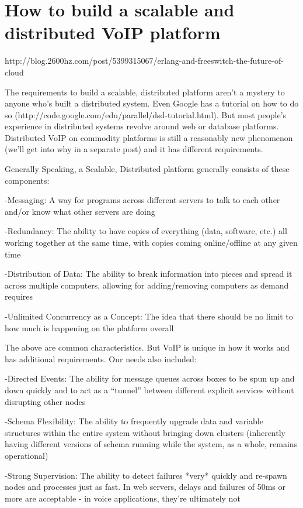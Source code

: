 \chapter{How to build a scalable and distributed VoIP platform}
\label{ch:platform}
http://blog.2600hz.com/post/5399315067/erlang-and-freeswitch-the-future-of-cloud

The requirements to build a scalable, distributed platform aren’t a mystery to anyone who’s built a distributed system. Even Google has a tutorial on how to do so (http://code.google.com/edu/parallel/dsd-tutorial.html). But most people’s experience in distributed systems revolve around web or database platforms. Distributed VoIP on commodity platforms is still a reasonably new phenomenon (we’ll get into why in a separate post) and it has different requirements.

Generally Speaking, a Scalable, Distributed platform generally consists of these components:

-Messaging: A way for programs across different servers to talk to each other and/or know what other servers are doing

-Redundancy: The ability to have copies of everything (data, software, etc.) all working together at the same time, with copies coming online/offline at any given time

-Distribution of Data: The ability to break information into pieces and spread it across multiple computers, allowing for adding/removing computers as demand requires

-Unlimited Concurrency as a Concept: The idea that there should be no limit to how much is happening on the platform overall 

The above are common characteristics. But VoIP is unique in how it works and has additional requirements. Our needs also included:

-Directed Events: The ability for message queues across boxes to be spun up and down quickly and to act as a “tunnel” between different explicit services without disrupting other nodes

-Schema Flexibility: The ability to frequently upgrade data and variable structures within the entire system without bringing down clusters (inherently having different versions of schema running while the system, as a whole, remains operational)

-Strong Supervision: The ability to detect failures *very* quickly and re-spawn nodes and processes just as fast. In web servers, delays and failures of 50ms or more are acceptable - in voice applications, they’re ultimately not

